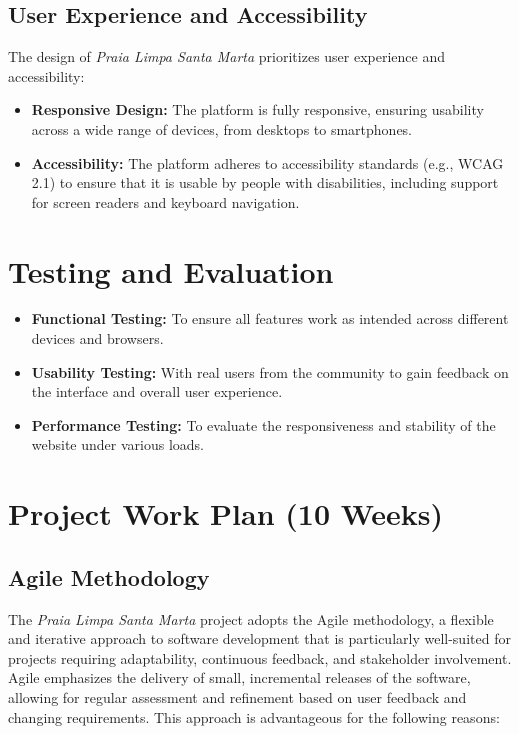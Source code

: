 \subsection{User Experience and Accessibility}

The design of \textit{Praia Limpa Santa Marta} prioritizes user experience and accessibility:

\begin{itemize}
    \item \textbf{Responsive Design:} The platform is fully responsive, ensuring usability across a wide range of devices, from desktops to smartphones.
    \item \textbf{Accessibility:} The platform adheres to accessibility standards (e.g., WCAG 2.1) to ensure that it is usable by people with disabilities, including support for screen readers and keyboard navigation.
\end{itemize}

\section{Testing and Evaluation}

\begin{itemize}
    \item \textbf{Functional Testing:} To ensure all features work as intended across different devices and browsers.
    \item \textbf{Usability Testing:} With real users from the community to gain feedback on the interface and overall user experience.
    \item \textbf{Performance Testing:} To evaluate the responsiveness and stability of the website under various loads.
\end{itemize}

\section{Project Work Plan (10 Weeks)}

\subsection*{Agile Methodology}

The \textit{Praia Limpa Santa Marta} project adopts the Agile methodology, a flexible and iterative approach to software development that is particularly well-suited for projects requiring adaptability, continuous feedback, and stakeholder involvement. Agile emphasizes the delivery of small, incremental releases of the software, allowing for regular assessment and refinement based on user feedback and changing requirements. This approach is advantageous for the following reasons:

